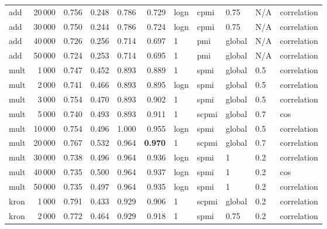 \begin{tabular}{lrrrrrlllll}
     add &           20\,000 &  0.756 &  0.248 &      0.786 &          0.729 &  logn &   cpmi &    0.75 &  N/A &    correlation \\
     add &           30\,000 &  0.750 &  0.244 &      0.786 &          0.724 &  logn &   cpmi &    0.75 &  N/A &    correlation \\
     add &           40\,000 &  0.726 &  0.256 &      0.714 &          0.697 &     1 &    pmi &  global &  N/A &    correlation \\
     add &           50\,000 &  0.724 &  0.253 &      0.714 &          0.695 &     1 &    pmi &  global &  N/A &    correlation \\ \addlinespace
    mult &            1\,000 &  0.747 &  0.452 &      0.893 &          0.889 &     1 &   spmi &  global &  0.5 &    correlation \\
    mult &            2\,000 &  0.741 &  0.466 &      0.893 &          0.895 &  logn &   spmi &  global &  0.5 &    correlation \\
    mult &            3\,000 &  0.754 &  0.470 &      0.893 &          0.902 &     1 &   spmi &  global &  0.5 &    correlation \\
    mult &            5\,000 &  0.740 &  0.493 &      0.893 &          0.911 &     1 &  scpmi &  global &  0.7 &            cos \\
    mult &           10\,000 &  0.754 &  0.496 &      1.000 &          0.955 &  logn &   spmi &  global &  0.5 &    correlation \\
    mult &           20\,000 &  0.767 &  0.532 &      0.964 &          \textbf{0.970} &     1 &  scpmi &  global &  0.7 &    correlation \\
    mult &           30\,000 &  0.738 &  0.496 &      0.964 &          0.936 &  logn &   spmi &       1 &  0.2 &    correlation \\
    mult &           40\,000 &  0.735 &  0.500 &      0.964 &          0.937 &  logn &   spmi &       1 &  0.2 &            cos \\
    mult &           50\,000 &  0.735 &  0.497 &      0.964 &          0.935 &  logn &   spmi &       1 &  0.2 &    correlation \\ \addlinespace
    kron &            1\,000 &  0.791 &  0.433 &      0.929 &          0.906 &     1 &  scpmi &  global &  0.2 &    correlation \\
    kron &            2\,000 &  0.772 &  0.464 &      0.929 &          0.918 &     1 &   spmi &    0.75 &  0.2 &    correlation \\

\end{tabular}
